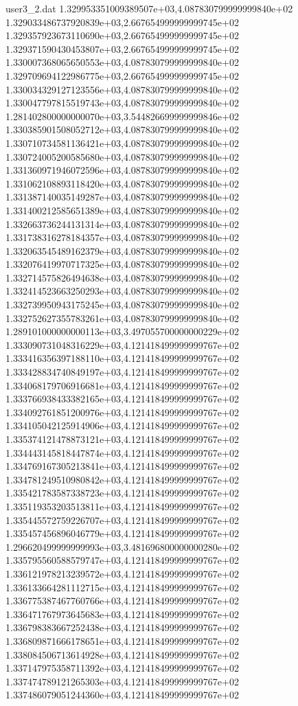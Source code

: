 \begin{filecontents}{user3_2.dat}
1.329953351009389507e+03,4.087830799999999840e+02
1.329033486737920839e+03,2.667654999999999745e+02
1.329357923673110690e+03,2.667654999999999745e+02
1.329371590430453807e+03,2.667654999999999745e+02
1.330007368065650553e+03,4.087830799999999840e+02
1.329709694122986775e+03,2.667654999999999745e+02
1.330034329127123556e+03,4.087830799999999840e+02
1.330047797815519743e+03,4.087830799999999840e+02
1.281402800000000070e+03,3.544826699999999846e+02
1.330385901508052712e+03,4.087830799999999840e+02
1.330710734581136421e+03,4.087830799999999840e+02
1.330724005200585680e+03,4.087830799999999840e+02
1.331360971946072596e+03,4.087830799999999840e+02
1.331062108893118420e+03,4.087830799999999840e+02
1.331387140035149287e+03,4.087830799999999840e+02
1.331400212585651389e+03,4.087830799999999840e+02
1.332663736244131314e+03,4.087830799999999840e+02
1.331738316278184357e+03,4.087830799999999840e+02
1.332063545489162379e+03,4.087830799999999840e+02
1.332076419970717325e+03,4.087830799999999840e+02
1.332714575826494638e+03,4.087830799999999840e+02
1.332414523663250293e+03,4.087830799999999840e+02
1.332739950943175245e+03,4.087830799999999840e+02
1.332752627355783261e+03,4.087830799999999840e+02
1.289101000000000113e+03,3.497055700000000229e+02
1.333090731048316229e+03,4.121418499999999767e+02
1.333416356397188110e+03,4.121418499999999767e+02
1.333428834740849197e+03,4.121418499999999767e+02
1.334068179706916681e+03,4.121418499999999767e+02
1.333766938433382165e+03,4.121418499999999767e+02
1.334092761851200976e+03,4.121418499999999767e+02
1.334105042125914906e+03,4.121418499999999767e+02
1.335374121478873121e+03,4.121418499999999767e+02
1.334443145818447874e+03,4.121418499999999767e+02
1.334769167305213841e+03,4.121418499999999767e+02
1.334781249510980842e+03,4.121418499999999767e+02
1.335421783587338723e+03,4.121418499999999767e+02
1.335119353203513811e+03,4.121418499999999767e+02
1.335445572759226707e+03,4.121418499999999767e+02
1.335457456896046779e+03,4.121418499999999767e+02
1.296620499999999993e+03,3.481696800000000280e+02
1.335795560588579747e+03,4.121418499999999767e+02
1.336121978213239572e+03,4.121418499999999767e+02
1.336133664281112715e+03,4.121418499999999767e+02
1.336775387467760766e+03,4.121418499999999767e+02
1.336471767973645683e+03,4.121418499999999767e+02
1.336798383667252438e+03,4.121418499999999767e+02
1.336809871666178651e+03,4.121418499999999767e+02
1.338084506713614928e+03,4.121418499999999767e+02
1.337147975358711392e+03,4.121418499999999767e+02
1.337474789121265303e+03,4.121418499999999767e+02
1.337486079051244360e+03,4.121418499999999767e+02

\end{filecontents}
